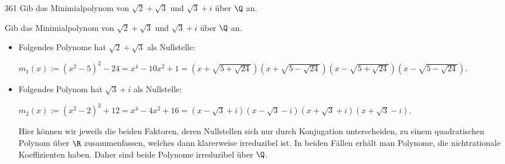 \begin{algebraUE}{361}
Gib das Minimialpolynom von $\sqrt{2} + \sqrt{3}$ und $\sqrt{3} + i$ über $\Q$ an.
\end{algebraUE}

\begin{solution}
  Gib das Minimialpolynom von $\sqrt{2} + \sqrt{3}$ und $\sqrt{3} + i$ über $\Q$ an.

  \begin{itemize}
  \item Folgendes Polynome hat $\sqrt{2} + \sqrt{3}$ als Nullstelle:

  $m_1(x) := (x^2 - 5)^2 - 24 = x^4 - 10x^2 + 1 = (x + \sqrt{5+\sqrt{24}})(x + \sqrt{5-\sqrt{24}})(x - \sqrt{5+\sqrt{24}})(x - \sqrt{5-\sqrt{24}}).$

  \item Folgendes Polynom hat $\sqrt{3} + i$ als Nullstelle:

  $m_2(x) := (x^2 -2)^2 + 12 = x^4 - 4x^2 + 16 = (x - \sqrt{3} + i)(x - \sqrt{3} - i)(x + \sqrt{3} + i)(x + \sqrt{3} - i).$

  Hier können wir jeweils die beiden Faktoren, deren Nullstellen sich nur durch Konjugation unterscheiden, zu einem quadratischen Polynom über $\R$ zusammenfassen, welches dann klarerweise irreduzibel ist. In beiden Fällen erhält man Polynome, die nichtrationale Koeffizienten haben. Daher sind beide Polynome irreduzibel über $\Q$.
  \end{itemize}
\end{solution}
